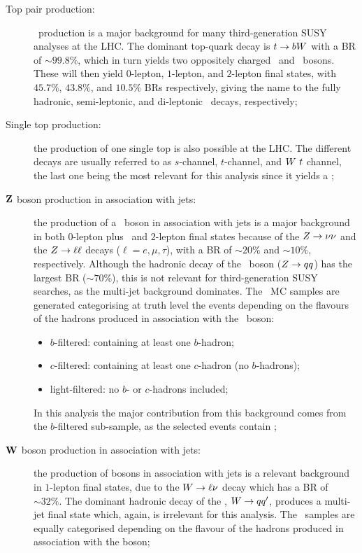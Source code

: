 		\begin{description}

			\item [Top pair production:] \ttbar\ production is a major background for many third-generation \ac{SUSY} analyses at the LHC. The dominant top-quark decay is $t \rightarrow b W$ with a \ac{BR} of $\sim 99.8\%$, which in turn yields two oppositely charged \bjs\ and \Wboson\ bosons. These will then yield $0$-lepton, $1$-lepton, and $2$-lepton final states, with $45.7\%$, $43.8\%$, and $10.5\%$ \acp{BR} respectively, giving the name to the fully hadronic, semi-leptonic, and di-leptonic \ttbar\ decays, respectively; 
			
			\item [Single top production:] the production of one single top is also possible at the LHC. The different decays are usually referred to as $s$-channel, $t$-channel, and $W\ t$ channel, the last one being the most relevant for this analysis since it yields a \Wboson; 

			\item [$\mathbf{Z}$ boson production in association with jets:] the production of a \Zboson\ boson in association with jets is a major background in both $0$-lepton plus \met\ and $2$-lepton final states because of the $Z \rightarrow \nu \nu$ and the $Z \rightarrow \ell \ell$ decays ($\ell = e,\mu,\tau$), with a \ac{BR} of $\sim 20\%$ and $\sim 10\%$, respectively. Although the hadronic decay of the \Zboson\ boson ($Z \rightarrow qq$) has the largest \ac{BR} ($\sim 70\%$), this is not relevant for third-generation \ac{SUSY} searches, as the multi-jet background dominates. The \Zjets\ \ac{MC} samples are generated categorising at truth level the events depending on the flavours of the hadrons produced in association with the \Zboson\ boson:
			\begin{itemize}
				\item $b$-filtered: containing at least one $b$-hadron;
				\item $c$-filtered: containing at least one $c$-hadron (no $b$-hadrons);
				\item light-filtered: no $b$- or $c$-hadrons included;
			\end{itemize} 
			In this analysis the major contribution from this background comes from the $b$-filtered sub-sample, as the selected events contain \bjs;

			\item [$\mathbf{W}$ boson production in association with jets:] the production of \Wboson bosons in association with jets is a relevant background in $1$-lepton final states, due to the $W \rightarrow \ell\nu$ decay which has a \ac{BR} of $\sim 32\%.$ The dominant hadronic decay of the \Wboson, $W \rightarrow qq'$, produces a multi-jet final state which, again, is irrelevant for this analysis. The \Wjets\ samples are equally categorised depending on the flavour of the hadrons produced in association with the \Wboson boson;


\end{description}
